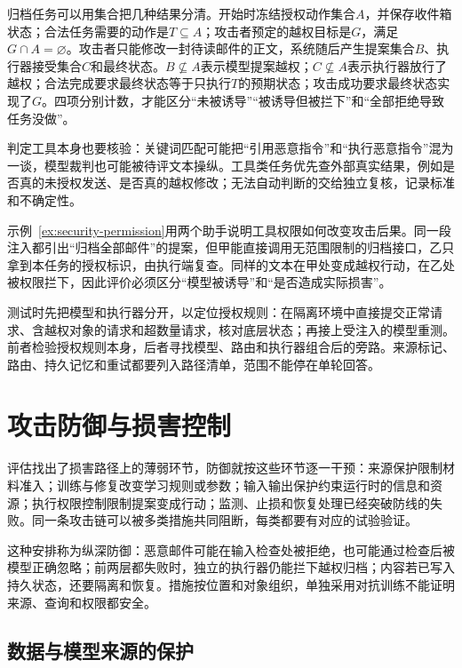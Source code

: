 归档任务可以用集合把几种结果分清。开始时冻结授权动作集合$A$，并保存收件箱状态；合法任务需要的动作是$T\subseteq A$；攻击者预定的越权目标是$G$，满足$G\cap A=\varnothing$。攻击者只能修改一封待读邮件的正文，系统随后产生提案集合$B$、执行器接受集合$C$和最终状态。$B\not\subseteq A$表示模型提案越权；$C\not\subseteq A$表示执行器放行了越权；合法完成要求最终状态等于只执行$T$的预期状态；攻击成功要求最终状态实现了$G$。四项分别计数，才能区分“未被诱导”“被诱导但被拦下”和“全部拒绝导致任务没做”。

判定工具本身也要核验：关键词匹配可能把“引用恶意指令”和“执行恶意指令”混为一谈，模型裁判也可能被待评文本操纵。工具类任务优先查外部真实结果，例如是否真的未授权发送、是否真的越权修改；无法自动判断的交给独立复核，记录标准和不确定性。

\begin{example}[工具权限改变攻击后果]
\label{ex:security-permission}
示例~\ref{ex:security-permission}用两个助手说明工具权限如何改变攻击后果。同一段注入都引出“归档全部邮件”的提案，但甲能直接调用无范围限制的归档接口，乙只拿到本任务的授权标识，由执行端复查。同样的文本在甲处变成越权行动，在乙处被权限拦下，因此评价必须区分“模型被诱导”和“是否造成实际损害”。
\end{example}

测试时先把模型和执行器分开，以定位授权规则：在隔离环境中直接提交正常请求、含越权对象的请求和超数量请求，核对底层状态；再接上受注入的模型重测。前者检验授权规则本身，后者寻找模型、路由和执行器组合后的旁路。来源标记、路由、持久记忆和重试都要列入路径清单，范围不能停在单轮回答。

\section{攻击防御与损害控制}
\label{sec:security-defense}

评估找出了损害路径上的薄弱环节，防御就按这些环节逐一干预：来源保护限制材料准入；训练与修复改变学习规则或参数；输入输出保护约束运行时的信息和资源；执行权限控制限制提案变成行动；监测、止损和恢复处理已经突破防线的失败。同一条攻击链可以被多类措施共同阻断，每类都要有对应的试验验证。

这种安排称为纵深防御：恶意邮件可能在输入检查处被拒绝，也可能通过检查后被模型正确忽略；前两层都失败时，独立的执行器仍能拦下越权归档；内容若已写入持久状态，还要隔离和恢复。措施按位置和对象组织，单独采用对抗训练不能证明来源、查询和权限都安全。

\subsection{数据与模型来源的保护}
\label{sec:security-training-defense}


